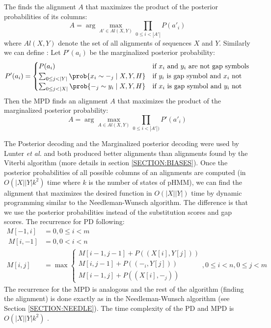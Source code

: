 The  finds the alignment $A$ that maximizes
the product of the posterior probabilities of its columns: 
\[A = \arg\max_{A'\in Al(X,Y)}\prod_{0\leq i <
|A'|}P(a'_i)\] where $Al(X,Y)$ denote the set of all  alignments of sequences
$X$ and $Y$. Similarly we can define : Let $P'(a_i)$ be the marginalized posterior probability:
\[
P'(a_i) = \begin{cases}
P(a_i) & \text{if $x_i$ and $y_i$ are not gap symbols}\\
\sum_{0\leq j < |Y|}\prob{x_i\sim -_{j}\mid X,Y,H}  & \text{if $y_i$ is gap symbol and $x_i$ not}\\
\sum_{0\leq j < |X|} \prob{-_{j}\sim y_i\mid X,Y,H}  & \text{if $x_i$ is gap symbol and $y_i$ not}
\end{cases}
\]
Then the MPD finds an alignment $A$ that maximizes the product of the
marginalized posterior probability:
\[A = \arg\max_{A\in Al(X,Y)}\prod_{0\leq i < |A'|)}P'(a'_i)\] 

The Posterior decoding and the Marginalized posterior decoding were used by
Lunter {\it et al.} and both produced better alignments than alignments found
by the Viterbi algorithm (more details in section \ref{SECTION:BIASES}). Once
the posterior probabilities of all possible columns of an alignments are
computed (in $O(|X||Y|k^2)$ time where $k$ is the number of states of pHMM), we
can find the alignment that maximizes the desired function in $O(|X||Y|)$ time
by dynamic programming similar to the Needleman-Wunsch algorithm.  The
difference is that we use the posterior probabilities instead of the
substitution scores and gap scores. The recurrence for PD following:
\begin{align} 
M[-1,i] &= 0, 0\leq i < m\\\
M[i,-1] &= 0, 0< i < n\\
M[i,j] &= \max
\begin{cases}
 M[i-1,j-1]+P((X[i],Y[j]))\\
 M[i,j-1]+P((-_{i}, Y[j]))\\
 M[i-1,j]+P((X[i], -_{j}))
\end{cases}, 0\leq i<n,0\leq j<m 
\end{align}
The recurrence for the MPD is analogous and the rest of the algorithm (finding
the alignment) is done exactly as in the Needleman-Wunsch algorithm (see
Section \ref{SECTION:NEEDLE}). The time complexity of the PD and MPD is
$O(|X||Y|k^2)$ \cite{Lunter2008}. 

